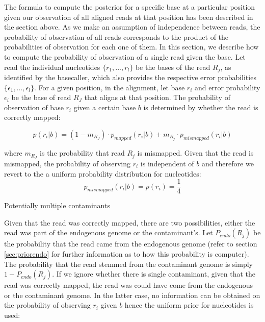 \documentclass[a4paper,12pt]{article}
\begin{document}
\noindent The formula to compute the posterior for a specific base at a particular position given our observation of all aligned reads at that position has been described in the section above. As we make an assumption of independence between reads, the probability of observation of all reads corresponds to the product of the probabilities of observation for each one of them. In this section, we describe how to compute the probability of observation of a single read given the base. Let read the individual nucleotides $\{ r_1, ..., r_l \}$ be the bases of the read $R_j$, as identified by the basecaller, which also provides the respective error probabilities $\{ \epsilon_1, ..., \epsilon_l \}$. For a given position, in the alignment, let base $r_i$ and error probability $\epsilon_i$ be the base of read $R_J$ that aligns at that position. The probability of observation of base $r_i$ given a certain base $b$ is determined by whether the read is correctly mapped:

\begin{equation}
  p(r_i|b)   =  (1-m_{R_J}) \cdot p_{mapped}(r_i|b) + m_{R_j} \cdot p_{mismapped}(r_i|b) 
\end{equation} 

\noindent where $m_{R_J}$ is the probability that read $R_j$ is mismapped. Given that the read is mismapped, the probability of observing $r_i$ is independent of $b$ and therefore we revert to the a uniform probability distribution for nucleotides:
\begin{equation}
  p_{mismapped}(r_i|b)   =  p(r_i) =     \frac{ 1} {4} 
\label{eqn:mismapped}
\end{equation} 



\noindent Potentially multiple contaminants


Given that the read was correctly mapped, there are two possibilities, either the read was part of the endogenous genome or the contaminant's. Let $P_{endo}(R_j)$ be the probability that the read came from the endogenous genome (refer to section \ref{sec:priorendo} for further information as to how this probability is computer). The probability that the read stemmed from the contaminant genome is simply $1-P_{endo}(R_j)$. If we ignore whether there is single contaminant, given that the read was correctly mapped, the read was could have come from the endogenous or the contaminant genome. In the latter case, no information can be obtained on the probability of observing $r_i$ given $b$ hence the uniform prior for nucleotides is used:
\end{document}
